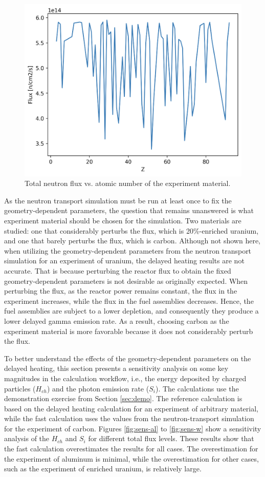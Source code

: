 \begin{figure}[htbp!]
  \begin{center}
    \includegraphics[width=0.60\linewidth]{figures/atr-materials-flux}
  \end{center}
  \caption{Total neutron flux vs. atomic number of the experiment material.}
  \label{fig:atr-flux}
\end{figure}

As the neutron transport simulation must be run at least once to fix the geometry-dependent parameters, the question that remains unanswered is what experiment material should be chosen for the simulation.
Two materials are studied: one that considerably perturbs the flux, which is 20\%-enriched uranium, and one that barely perturbs the flux, which is carbon.
Although not shown here, when utilizing the geometry-dependent parameters from the neutron transport simulation for an experiment of uranium, the delayed heating results are not accurate.
That is because perturbing the reactor flux to obtain the fixed geometry-dependent parameters is not desirable as originally expected.
When perturbing the flux, as the reactor power remains constant, the flux in the experiment increases, while the flux in the fuel assemblies decreases.
Hence, the fuel assemblies are subject to a lower depletion, and consequently they produce a lower delayed gamma emission rate.
As a result, choosing carbon as the experiment material is more favorable because it does not considerably perturb the flux.

To better understand the effects of the geometry-dependent parameters on the delayed heating, this section presents a sensitivity analysis on some key magnitudes in the calculation workflow, i.e., the energy deposited by charged particles ($H_{ch}$) and the photon emission rate ($S_i$).
The calculations use the demonstration exercise from Section \ref{sec:demo}.
The reference calculation is based on the delayed heating calculation for an  experiment of arbitrary material, while the fast calculation uses the values from the neutron-transport simulation for the experiment of carbon.
Figures \ref{fig:sens-al} to \ref{fig:sens-w} show a sensitivity analysis of the $H_{ch}$ and $S_i$ for different total flux levels.
These results show that the fast calculation overestimates the results for all cases.
The overestimation for the experiment of aluminum is minimal, while the overestimation for other cases, such as the experiment of enriched uranium, is relatively large.

